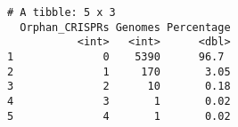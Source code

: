 \documentclass[
  twocolumn,
  landscape]{report}
\begin{document}
\begin{verbatim}
# A tibble: 5 x 3
  Orphan_CRISPRs Genomes Percentage
           <int>   <int>      <dbl>
1              0    5390      96.7 
2              1     170       3.05
3              2      10       0.18
4              3       1       0.02
5              4       1       0.02
\end{verbatim}
\end{document}
